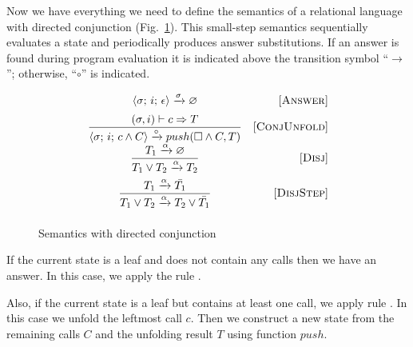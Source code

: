 
Now we have everything we need to define the semantics of a relational language with directed conjunction (Fig.~\ref{fair:classic-semantics}). This small-step semantics sequentially
evaluates a state and periodically produces answer substitutions. If an answer is found during program evaluation it is indicated above the transition
symbol ``$\xrightarrow{}$''; otherwise, ``$\circ$'' is indicated.

\begin{figure}[h!]
\[\begin{array}{cr}
     {\langle \sigma;\, i;\, \epsilon \rangle \xrightarrow{\sigma} \varnothing}  
&     \mbox{[\textsc{Answer}]} \\[2mm]
\dfrac{(\sigma, i) \vdash c \Rightarrow T}
      {\langle \sigma;\, i;\, c \land C \rangle \xrightarrow{\circ} push(\Box \land C, T)}
&     \mbox{[\textsc{ConjUnfold}]} \\[2mm]
\dfrac{T_1 \xrightarrow{\alpha} \varnothing}
      {T_1 \lor T_2 \xrightarrow{\alpha} T_2}
&     \mbox{[\textsc{Disj}]} \\[4mm]
\dfrac{T_1 \xrightarrow{\alpha} \bar{T_1}}
      {T_1 \lor T_2 \xrightarrow{\alpha} T_2 \lor\bar{T_1}}
&     \mbox{[\textsc{DisjStep}]} \\[4mm]
\end{array}\]
\caption{Semantics with directed conjunction}
\label{fair:classic-semantics}
\end{figure}

If the current state is a leaf and does not contain any calls then we have an answer. In this case, we apply the rule .

Also, if the current state is a leaf but contains at least one call, we apply rule . In this case we unfold the leftmost call $c$.
Then we construct a new state from the remaining calls $C$ and the unfolding result $T$ using function $push$.

